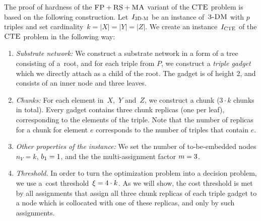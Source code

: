 The proof of hardness of the $\textsc{FP}+\textsc{RS}+\textsc{MA}$ variant of the $\textsc{CTE}$ problem is based on the following construction.
Let~$I_{\mathrm{\textsc{3D-M}}}$ be an instance of~$\textsc{3-DM}$ with $p$ triples and set cardinality~${k = |X| = |Y| = |Z|}$.
We create an instance~$I_{\mathrm{\textsc{CTE}}}$ of the $\textsc{CTE}$ problem in the following way:
\begin{enumerate}
\item \emph{Substrate network:} We construct a substrate network in a form of a tree consisting of a~root,
and for each triple from $P$, we construct a \emph{triple gadget} which we directly attach as
a child of the root. The gadget is of height 2,
and consists of an inner node and three leaves.
\item \emph{Chunks:} For each element in~$X$,~$Y$ and~$Z$,
 we construct a chunk
($3 \cdot k$ chunks in total). Every gadget contains three chunk replicas (one per leaf),
corresponding to the elements of the triple.
Note that the number of replicas for a chunk for element $e$ corresponds to the number of triples that contain $e$.
\item \emph{Other properties of the instance:} We set the number of to-be-embedded nodes $n_V = k$,
$b_1 = 1$, and the the multi-assignment factor
$m=3$.
\item \emph{Threshold.} In order to turn the optimization problem into a decision problem, we use
a~cost threshold~$\xi = 4\cdot k$. As we will show, the cost threshold is met by all
assignments that assign all three chunk replicas of each triple gadget to a
node which is collocated with one of these replicas, and only by such assignments.
\end{enumerate}

%



